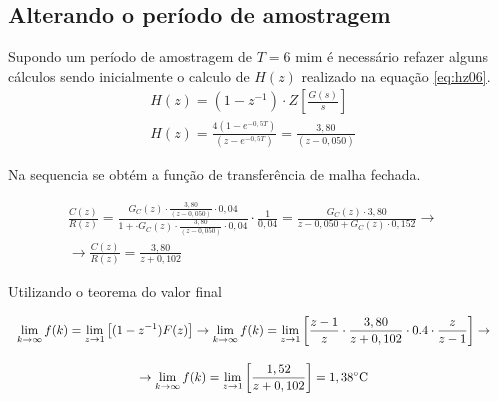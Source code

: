 \documentclass[a4paper,12pt]{article}
\begin{document}
		\subsection{Alterando o período de amostragem}
			Supondo um período de amostragem de $T=6$ mim é necessário refazer alguns cálculos sendo inicialmente o calculo de $H(z)$ realizado na equação \ref{eq:hz06}.
			\begin{equation}
			\left.
			\begin{array}{c}
				\displaystyle H(z) = (1 - z^{-1}) \cdot Z\left[\frac{G(s)}{s}\right] \\[20pt]
				
				\displaystyle H(z)  = \frac{4(1 - e^{-0,5T})}{(z-e^{-0,5T})} = \frac{3,80}{(z-0,050)}
			\end{array}
			\right.
			\quad 
		\end{equation}
		
		Na sequencia se obtém a função de transferência de malha fechada.
		
			
		\begin{equation}
			\left.
			\begin{array}{c}
				\displaystyle \frac{C(z)}{R(z)} = \frac{G_C(z) \cdot \displaystyle \frac{3,80}{(z-0,050)} \cdot 0,04}{1 + \cdot G_C(z) \cdot \displaystyle \frac{3,80}{(z-0,050)} \cdot 0,04} \cdot \frac{1}{0,04} = \frac{G_C(z) \cdot 3,80}{z - 0,050 + G_C(z) \cdot 0,152} \rightarrow \\[30pt]
				
				\displaystyle \rightarrow \frac{C(z)}{R(z)} = \frac{3,80}{z + 0,102}
			\end{array}
			\right.
			\quad 
			\label{eq:ftma}
		\end{equation}

		Utilizando o teorema do valor final
		
		\begin{equation}
			\left.
			\begin{array}{c}
				\displaystyle \lim_{k \to \infty}f(k) = \lim_{z \to 1}\left[(1-z^{-1})F(z) \right] \rightarrow \lim_{k \to \infty}f(k) = \lim_{z \to 1}\left[ \frac{z-1}{z} \cdot \frac{3,80}{z + 0,102} \cdot 0.4 \cdot \frac{z}{z-1}  \right] \rightarrow \\[20pt]
				
				\displaystyle \rightarrow \lim_{k \to \infty}f(k) =  \lim_{z \to 1}\left[  \frac{1,52}{z + 0,102}  \right] = 1,38 \celsius
			\end{array}
			\right.
			\quad 
		\end{equation}	
		
\end{document}
